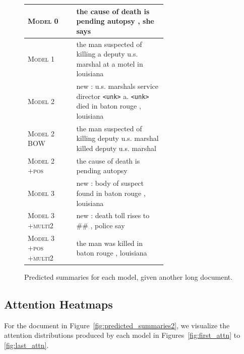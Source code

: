 \documentclass[12pt]{report}
\begin{document}
\begin{figure}[p]
\begin{tabular}{ll p{0.65\linewidth}}
\textsc{Model 0} & & the cause of death is pending autopsy , she says \\
\midrule
 \textsc{Model 1} & & the man suspected of killing a deputy u.s. marshal at a motel in louisiana \\
\midrule
\textsc{Model 2 } & & new : u.s. marshals service director \texttt{<unk>} a. \texttt{<unk>} died in baton rouge , louisiana \\
\textsc{Model 2 BOW} & &  the man suspected of killing deputy u.s. marshal killed deputy u.s. marshal \\
\textsc{Model 2 +pos} & & the cause of death is pending autopsy \\
\midrule
\textsc{Model 3 } & & new : body of suspect found in baton rouge , louisiana \\
\textsc{Model 3 +multi2} & &  new : death toll rises to \#\# , police say \\
\textsc{Model 3 +pos +multi2} & & the man was killed in baton rouge , louisiana \\
\bottomrule
\end{tabular}
\caption[Predicted Summaries 3]{Predicted summaries for each model, given another long document.}
\label{fig:predicted_summaries3}
\end{figure}


\pagebreak

\subsection{Attention Heatmaps}
\label{sec:attn}

For the document in Figure~\ref{fig:predicted_summaries2}, we visualize the attention distributions produced by each model in Figures~\ref{fig:first_attn} to \ref{fig:last_attn}.
\end{document}
